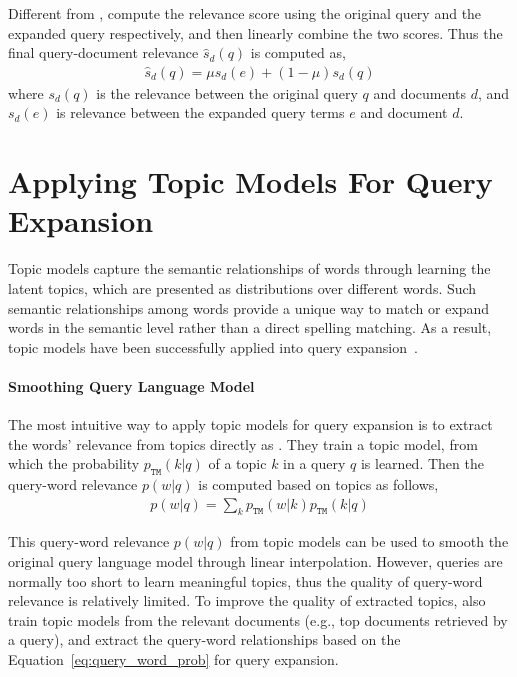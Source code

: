 Different from \cite{zhai-01b}, \cite{Lavrenko-2001} compute the relevance score using the original query and the expanded query respectively, and then linearly combine the two scores. Thus the final query-document relevance $\hat{s}_d(q)$ is computed as,
\begin{align}
\label{eq:rm_qe_comb}
\hat{s}_d(q) = \mu s_d(e) + (1-\mu)s_d(q)
\end{align}
where $s_d(q)$ is the relevance between the original query $q$ and documents $d$, and $s_d(e)$ is relevance between the expanded query terms $e$ and document $d$.

\section{Applying Topic Models For Query Expansion}

Topic models capture the semantic relationships of words through learning the latent topics, which are presented as distributions over different words. Such semantic relationships among words provide a unique way to match or expand words in the semantic level rather than a direct spelling matching. As a result, topic models have been successfully applied into query expansion~\citep{Yi-2009,Park-2009}.

\paragraph{Smoothing Query Language Model}

The most intuitive way to apply topic models for query expansion is to extract the words' relevance from topics directly as \cite{Yi-2009}. They train a topic model, from which the probability $p_{\texttt{TM}}(k|q)$ of a topic $k$ in a query $q$ is learned. Then the query-word relevance $p(w|q)$ is computed based on topics as follows,
\begin{align}
\label{eq:query_word_prob}
p(w|q) = \sum_k p_{\texttt{TM}}(w|k) p_{\texttt{TM}}(k|q)
\end{align}

This query-word relevance $p(w|q)$ from topic models can be used to smooth the original query language model through linear interpolation. However, queries are normally too short to learn meaningful topics, thus the quality of query-word relevance is relatively limited. To improve the quality of extracted topics, \cite{Yi-2009} also train topic models from the relevant documents (e.g., top documents retrieved by a query), and extract the query-word relationships based on the Equation~\ref{eq:query_word_prob} for query expansion.


